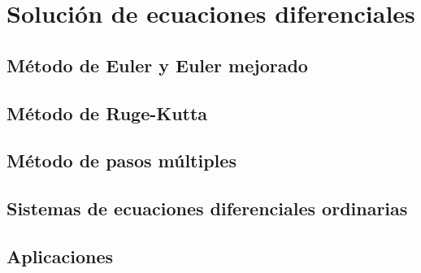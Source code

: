 \chapter{Solución de ecuaciones diferenciales}

\section{Método de Euler y Euler mejorado}
\section{Método de Ruge-Kutta}
\section{Método de pasos múltiples}
\section{Sistemas de ecuaciones diferenciales ordinarias}
\section{Aplicaciones}


